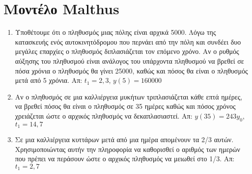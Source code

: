 \section*{Μοντέλο Malthus}

\begin{enumerate}
  \item Υποθέτουμε ότι ο πληθυσμός μιας πόλης είναι αρχικά 5000. Λόγω της κατασκευής 
    ενός αυτοκινητόδρομου που περνάει από την πόλη και συνδέει δυο μεγάλες επαρχίες ο
    πληθυσμός διπλασιάζεται τον επόμενο χρόνο. Αν ο ρυθμός αύξησης του πληθυσμού είναι 
    ανάλογος του υπάρχοντα πληθυσμού να βρεθεί σε πόσα χρόνια ο πληθυσμός θα γίνει 
    25000, καθώς και πόσος θα είναι ο πληθυσμός μετά από 5 χρόνια.
    \hfill Απ: $ t_{1}=2,3 $, $ y(5)=160000 $ 

  \item Αν ο πληθυσμός σε μια καλλιέργεια μυκήτων τριπλασιάζεται κάθε επτά ημέρες, να 
    βρεθεί πόσος θα είναι ο πληθυσμός σε 35 ημέρες καθώς και πόσος χρόνος χρειάζεται 
    ώστε ο αρχικός πληθυσμός να δεκαπλασιαστεί.
    \hfill Απ: $ y(35)=243 y_{0} $, $ t_{1}=14,7 $ 

  \item Σε μια καλλιέργεια κυττάρων μετά από μια ημέρα απομένουν τα 2/3 αυτών.
    Χρησιμοποιώντας αυτήν την πληροφορία να καθορισθεί ο αριθμός των ημερών που πρέπει να
    περάσουν ώστε ο αρχικός πληθυσμός να μειωθεί στο 1/3.
    \hfill Απ: $ t_{1}=2,7 $ 
\end{enumerate}




